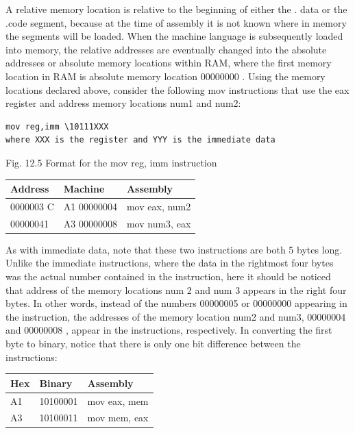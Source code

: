 \documentclass[10pt]{book}
\begin{document}
A relative memory location is relative to the beginning of either the . data or the .code segment, because at the time of assembly it is not known where in memory the segments will be loaded. When the machine language is subsequently loaded into memory, the relative addresses are eventually changed into the absolute addresses or absolute memory locations within RAM, where the first memory location in RAM is absolute memory location 00000000 . Using the memory locations declared above, consider the following mov instructions that use the eax register and address memory locations num1 and num2:

\begin{verbatim}
mov reg,imm \10111XXX 
where XXX is the register and YYY is the immediate data
\end{verbatim}

Fig. 12.5 Format for the mov reg, imm instruction

\begin{center}
\begin{tabular}{|l|l|l|}
\hline
Address & Machine & Assembly \\
\hline
0000003 C & A1 00000004 & mov eax, num2 \\
\hline
00000041 & A3 00000008 & mov num3, eax \\
\hline
\end{tabular}
\end{center}

As with immediate data, note that these two instructions are both 5 bytes long. Unlike the immediate instructions, where the data in the rightmost four bytes was the actual number contained in the instruction, here it should be noticed that address of the memory locations num 2 and num 3 appears in the right four bytes. In other words, instead of the numbers 00000005 or 00000000 appearing in the instruction, the addresses of the memory location num2 and num3, 00000004 and 00000008 , appear in the instructions, respectively. In converting the first byte to binary, notice that there is only one bit difference between the instructions:

\begin{center}
\begin{tabular}{|l|l|l|}
\hline
Hex & Binary & Assembly \\
\hline
A1 & 10100001 & mov eax, mem \\
\hline
A3 & 10100011 & mov mem, eax \\
\hline
\end{tabular}
\end{center}
\end{document}

